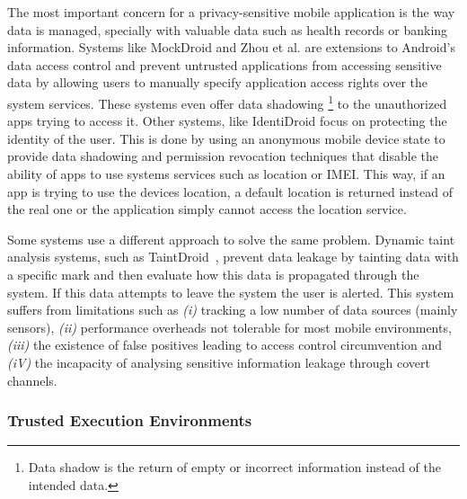 The most important concern for a privacy-sensitive mobile application is the way data is managed, specially with valuable data such as health records or banking information. Systems like MockDroid \cite{beresford2011mockdroid} and Zhou et al. \cite{zhou2011taming} are extensions to Android's data access control and prevent untrusted applications from accessing sensitive data by allowing users to manually specify application access rights over the system services. These systems even offer data shadowing \footnote{Data shadow is the return of empty or incorrect information instead of the intended data.} to the unauthorized apps trying to access it. Other systems, like IdentiDroid \cite{shebaro2014identidroid} focus on protecting the identity of the user. This is done by using an anonymous mobile device state to provide data shadowing and permission revocation techniques that disable the ability of apps to use systems services such as location or \ac{IMEI}. This way, if an app is trying to use the devices location, a default location is returned instead of the real one or the application simply cannot access the location service.

Some systems use a different approach to solve the same problem. Dynamic taint analysis systems, such as TaintDroid~\cite{enck2014taintdroid}, prevent data leakage by tainting data with a specific mark and then evaluate how this data is propagated through the system. If this data attempts to leave the system the user is alerted. This system suffers from limitations such as \emph{(i)} tracking a low number of data sources (mainly sensors), \emph{(ii)} performance overheads not tolerable for most mobile environments, \emph{(iii)} the existence of false positives leading to access control circumvention and \emph{(iV)} the incapacity of analysing sensitive information leakage through covert channels.


\subsubsection{Trusted Execution Environments}
\label{sec:tee}

